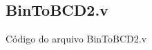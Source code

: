 \documentclass[
	12pt,				%
	openright,			%
	a4paper,			%
	english,			%
	french,				%
	spanish,			%
	brazilian,				%
	]{abntex2}
\begin{document}


\postextual





\begin{apendicesenv}

\partapendices

\chapter{BinToBCD2.v}
\label{code:BinToBCD2.v}
Código do arquivo BinToBCD2.v
 

\end{apendicesenv}




\printindex
\end{document}
